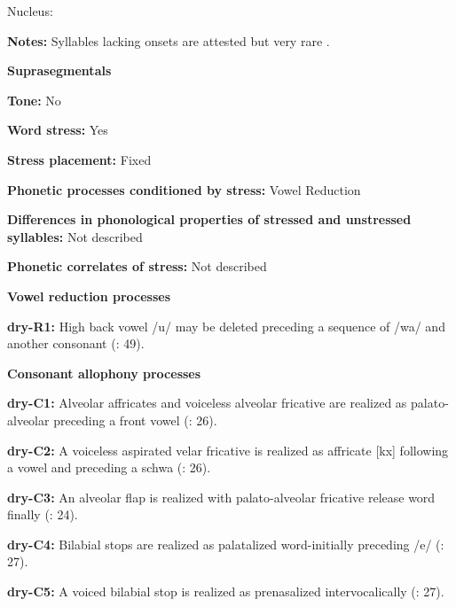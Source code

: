 Nucleus:



\textbf{Notes:} Syllables lacking onsets are attested but very rare \citep[19]{Dhakal2012}.



\textbf{Suprasegmentals}



\textbf{Tone:} No



\textbf{Word stress:} Yes



\textbf{Stress placement:} Fixed



\textbf{Phonetic processes conditioned by stress:} Vowel Reduction



\textbf{Differences in phonological properties of stressed and unstressed syllables:} Not described



\textbf{Phonetic correlates of stress:} Not described



\textbf{Vowel reduction processes}



\textbf{dry-R1:} High back vowel /u/ may be deleted preceding a sequence of /wa/ and another consonant (\citealt{KotapishKotapish1973}: 49).



\textbf{Consonant allophony processes}



\textbf{dry-C1:} Alveolar affricates and voiceless alveolar fricative are realized as palato-alveolar preceding a front vowel (\citealt{KotapishKotapish1978}: 26).



\textbf{dry-C2:} A voiceless aspirated velar fricative is realized as affricate [kx] following a vowel and preceding a schwa (\citealt{KotapishKotapish1978}: 26).



\textbf{dry-C3:} An alveolar flap is realized with palato-alveolar fricative release word finally (\citealt{KotapishKotapish1978}: 24).



\textbf{dry-C4:} Bilabial stops are realized as palatalized word-initially preceding /e/ (\citealt{KotapishKotapish1978}: 27).



\textbf{dry-C5:} A voiced bilabial stop is realized as prenasalized intervocalically (\citealt{KotapishKotapish1978}: 27).



